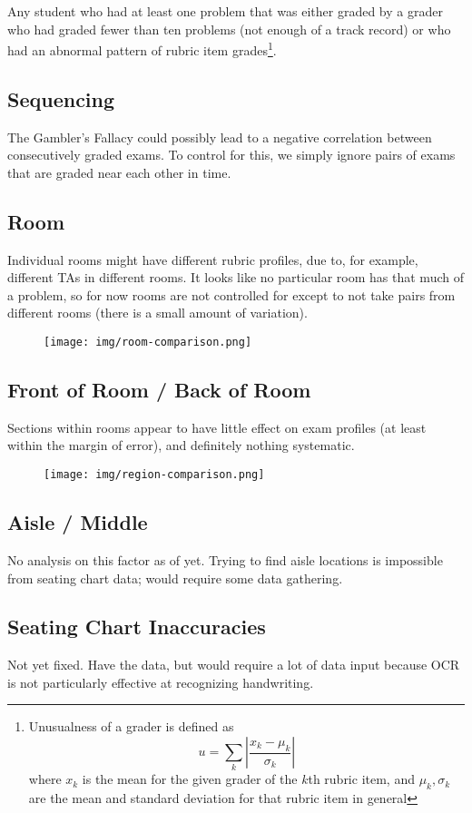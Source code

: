 \documentclass{article}
\begin{document}
        Any student who had at least one problem that was either graded by a grader who had graded fewer
            than ten problems (not enough of a track record) or who had an abnormal pattern of rubric item
            grades\footnote{Unusualness of a grader is defined as
                $$u = \sum_k \left|\frac{x_k - \mu_k}{\sigma_k}\right|$$ where $x_k$ is the mean for the 
                given grader of the $k$th rubric item, and $\mu_k, \sigma_k$ are the mean and standard
                deviation for that rubric item in general}.
    \subsection{Sequencing}
        The Gambler's Fallacy could possibly lead to a negative correlation between consecutively graded
            exams. To control for this, we simply ignore pairs of exams that are graded near each other in
            time.
    \subsection{Room}
        Individual rooms might have different rubric profiles, due to, for example, different TAs in
            different rooms. It looks like no particular room has that much of a problem, so for now
            rooms are not controlled for except to not take pairs from different rooms (there is a
            small amount of variation).
        \begin{figure}[h!]
            \centering
            \texttt{[image: img/room-comparison.png]}
        \end{figure}
    \subsection{Front of Room / Back of Room}
        Sections within rooms appear to have little effect on exam profiles (at least within the
            margin of error), and definitely nothing systematic.
        \begin{figure}[h!]
            \centering
            \texttt{[image: img/region-comparison.png]}
        \end{figure}
    \subsection{Aisle / Middle}
        No analysis on this factor as of yet. Trying to find aisle locations is impossible from
            seating chart data; would require some data gathering.
    \subsection{Seating Chart Inaccuracies}
        Not yet fixed. Have the data, but would require a lot of data input because OCR is not particularly
            effective at recognizing handwriting.
\end{document}
